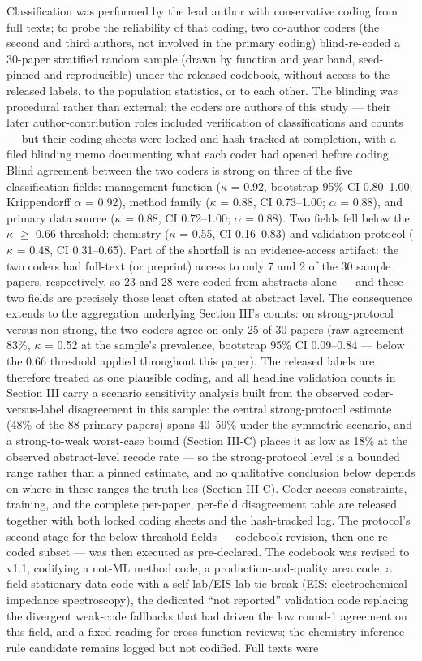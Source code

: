 \documentclass[journal]{IEEEtran}
\begin{document}
Classification was performed by the lead author with conservative coding from full texts; to probe the reliability of that coding, two co-author coders (the second and third authors, not involved in the primary coding) blind-re-coded a 30-paper stratified random sample (drawn by function and year band, seed-pinned and reproducible) under the released codebook, without access to the released labels, to the population statistics, or to each other. The blinding was procedural rather than external: the coders are authors of this study --- their later author-contribution roles included verification of classifications and counts --- but their coding sheets were locked and hash-tracked at completion, with a filed blinding memo documenting what each coder had opened before coding. Blind agreement between the two coders is strong on three of the five classification fields: management function ($\kappa$ = 0.92, bootstrap 95\% CI 0.80--1.00; Krippendorff $\alpha$ = 0.92), method family ($\kappa$ = 0.88, CI 0.73--1.00; $\alpha$ = 0.88), and primary data source ($\kappa$ = 0.88, CI 0.72--1.00; $\alpha$ = 0.88). Two fields fell below the $\kappa$ $\ge$ 0.66 threshold: chemistry ($\kappa$ = 0.55, CI 0.16--0.83) and validation protocol ($\kappa$ = 0.48, CI 0.31--0.65). Part of the shortfall is an evidence-access artifact: the two coders had full-text (or preprint) access to only 7 and 2 of the 30 sample papers, respectively, so 23 and 28 were coded from abstracts alone --- and these two fields are precisely those least often stated at abstract level. The consequence extends to the aggregation underlying Section III's counts: on strong-protocol versus non-strong, the two coders agree on only 25 of 30 papers (raw agreement 83\%, $\kappa$ = 0.52 at the sample's prevalence, bootstrap 95\% CI 0.09--0.84 --- below the 0.66 threshold applied throughout this paper). The released labels are therefore treated as one plausible coding, and all headline validation counts in Section III carry a scenario sensitivity analysis built from the observed coder-versus-label disagreement in this sample: the central strong-protocol estimate (48\% of the 88 primary papers) spans 40--59\% under the symmetric scenario, and a strong-to-weak worst-case bound (Section III-C) places it as low as 18\% at the observed abstract-level recode rate --- so the strong-protocol level is a bounded range rather than a pinned estimate, and no qualitative conclusion below depends on where in these ranges the truth lies (Section III-C). Coder access constraints, training, and the complete per-paper, per-field disagreement table are released together with both locked coding sheets and the hash-tracked log. The protocol's second stage for the below-threshold fields --- codebook revision, then one re-coded subset --- was then executed as pre-declared. The codebook was revised to v1.1, codifying a not-ML method code, a production-and-quality area code, a field-stationary data code with a self-lab/EIS-lab tie-break (EIS: electrochemical impedance spectroscopy), the dedicated ``not reported'' validation code replacing the divergent weak-code fallbacks that had driven the low round-1 agreement on this field, and a fixed reading for cross-function reviews; the chemistry inference-rule candidate remains logged but not codified. Full texts were 
\end{document}
